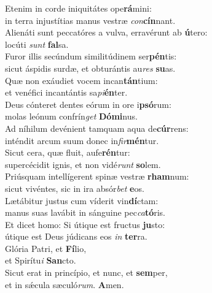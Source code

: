 \evenverse Etenim in corde iniquitátes ope\textbf{rá}mini:~\*\\
\evenverse in terra injustítias manus vestræ \textit{con}\textbf{cín}nant.\\
\oddverse Alienáti sunt peccatóres a vulva, erravérunt ab \textbf{ú}tero:~\*\\
\oddverse locúti \textit{sunt} \textbf{fal}sa.\\
\evenverse Furor illis secúndum similitúdinem ser\textbf{pén}tis:~\*\\
\evenverse sicut áspidis surdæ, et obturántis au\textit{res} \textbf{su}as.\\
\oddverse Quæ non exáudiet vocem incan\textbf{tán}tium:~\*\\
\oddverse et venéfici incantántis sa\textit{pi}\textbf{én}ter.\\
\evenverse Deus cónteret dentes eórum in ore i\textbf{psó}rum:~\*\\
\evenverse molas leónum confrín\textit{get} \textbf{Dó}\textbf{mi}nus.\\
\oddverse Ad níhilum devénient tamquam aqua de\textbf{cúr}rens:~\*\\
\oddverse inténdit arcum suum donec in\textit{fir}\textbf{mén}tur.\\
\evenverse Sicut cera, quæ fluit, aufe\textbf{rén}tur:~\*\\
\evenverse supercécidit ignis, et non vidé\textit{runt} \textbf{so}lem.\\
\oddverse Priúsquam intellígerent spinæ vestræ \textbf{rham}num:~\*\\
\oddverse sicut vivéntes, sic in ira absór\textit{bet} \textbf{e}os.\\
\evenverse Lætábitur justus cum víderit vin\textbf{dí}ctam:~\*\\
\evenverse manus suas lavábit in sánguine pec\textit{ca}\textbf{tó}ris.\\
\oddverse Et dicet homo: Si útique est fructus \textbf{ju}sto:~\*\\
\oddverse útique est Deus júdicans eos \textit{in} \textbf{ter}ra.\\
\evenverse Glória Patri, et \textbf{Fí}lio,~\*\\
\evenverse et Spirítu\textit{i} \textbf{San}cto.\\
\oddverse Sicut erat in princípio, et nunc, et \textbf{sem}per,~\*\\
\oddverse et in sǽcula sæculó\textit{rum}. \textbf{A}men.\\
